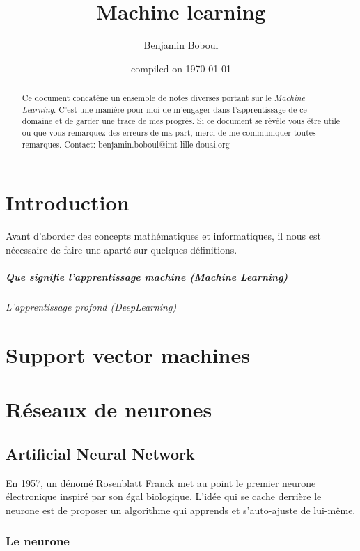 \documentclass{report}
\title{Machine learning}
\author{Benjamin Boboul}
\date{compiled on \today}
\begin{document}
	\maketitle

	\begin{abstract}
	Ce document concatène un ensemble de notes diverses portant sur le \textit{Machine Learning}.
	C'est une manière pour moi de m'engager dans l'apprentissage de ce domaine et de garder une trace de mes progrès.
	Si ce document se révèle vous être utile ou que vous remarquez des erreurs de ma part, merci de me communiquer toutes remarques.
	Contact: benjamin.boboul@imt-lille-douai.org
	\end{abstract}

	\chapter{Introduction}
	Avant d'aborder des concepts mathématiques et informatiques, il nous est nécessaire de faire une aparté sur quelques définitions.

	\paragraph{Que signifie l'apprentissage machine (Machine Learning)}

	\subparagraph{L'apprentissage profond (DeepLearning)}

	\chapter{Support vector machines}
	

	\chapter{Réseaux de neurones}

	\section{Artificial Neural Network}
	
	En 1957, un dénomé Rosenblatt Franck met au point le premier neurone électronique inspiré par son égal biologique.
	L'idée qui se cache derrière le neurone est de proposer un algorithme qui apprends et s'auto-ajuste de lui-même.
	
	\subsection{Le neurone}
	
\end{document}
